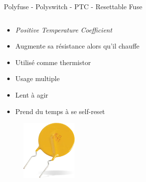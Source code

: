 \begin{frame}{Polyfuse - Polyswitch - PTC - Resettable Fuse}
    \begin{columns}
        \begin{column}{0.6\textwidth}
            \begin{itemize}
                \item \textit{Positive Temperature Coefficient}
                \item Augmente sa résistance alors qu'il chauffe
                \item Utilisé comme thermistor
                \bigskip
                \item Usage multiple
                \item Lent à agir
                \item Prend du temps à se self-reset
            \end{itemize}
            \vspace{12pt}
            \begin{figure}
                \centering
                \includegraphics[width=0.25\textwidth]{pictures/polyfuse.png}
            \end{figure}
        \end{column}


\end{columns}
\end{frame}
